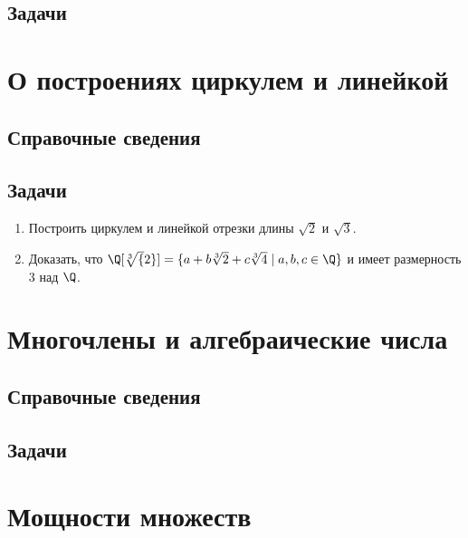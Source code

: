 \subsection*{Задачи}



\section{О построениях циркулем и линейкой}

\subsection*{Справочные сведения}

\subsection*{Задачи}

\begin{enumerate}
\item Построить циркулем и линейкой отрезки длины $\sqrt 2$ и $\sqrt 3$.
\item Доказать, что $\Q[\sqrt[3]{2}]=\{a+b\sqrt[3]{2}+c\sqrt[3]{4}\;|\;a,b,c\in\Q\}$ и имеет размерность 3 над $\Q$.
\end{enumerate}





\section{Многочлены и алгебраические числа}

\subsection*{Справочные сведения}

\subsection*{Задачи}

\section{Мощности множеств}\label{powers}

